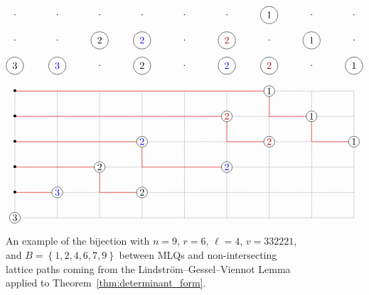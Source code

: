 \documentclass[submission]{FPSAC2018}
\newcommand{\set}[1]{\left\{ #1 \right\}}
\theoremstyle{plain}
\theoremstyle{definition}
\numberwithin{equation}{section}
\begin{document}
\begin{figure}[t]
\[
\begin{tikzpicture}[xscale=1.5,yscale=0.9]
  \begin{scope}[yshift=7cm]
    \foreach \i in {1,...,9}{
      \foreach \j in {0,1,2}{
        \node at (\i,\j){$\cdot$};
      }
    }
    \node[circle,fill=white,draw=black] at  (1, 0){$3$};
    \node[circle,fill=white,draw=black,text=blue] at  (2, 0){$3$};
    \node[circle,fill=white,draw=black] at  (4, 0){$2$};
    \node[circle,fill=white,draw=black,text=blue] at  (6, 0){$2$};
    \node[circle,fill=white,draw=black,text=darkred] at  (7, 0){$2$};
    \node[circle,fill=white,draw=black] at  (9, 0){$1$};
    \node[circle,fill=white,draw=black] at  (3, 1){$2$};
    \node[circle,fill=white,draw=black,text=blue] at  (4, 1){$2$};
    \node[circle,fill=white,draw=black,text=darkred] at  (6, 1){$2$};
    \node[circle,fill=white,draw=black] at  (8, 1){$1$};
    \node[circle,fill=white,draw=black] at  (7, 2){$1$};
  \end{scope}

  \draw[densely dotted] (1,1) grid (9,6);

  \draw[draw=red] (1,2)--(2,2);
  \draw[draw=red] (1,3)--(3,3)--(3,2)--(4,2);
  \draw[draw=red] (1,4)--(4,4)--(4,3)--(6,3);
  \draw[draw=red] (1,5)--(6,5)--(6,4)--(7,4);
  \draw[draw=red] (1,6)--(7,6)--(7,5)--(8,5)--(8,4)--(9,4);
  
  \node[circle,fill=white,draw=black,inner sep=1pt] at (1,1) {$3$};
  \node[circle,fill=white,draw=black,text=blue,inner sep=1pt] at (2,2) {$3$};
  \node[circle,fill=white,draw=black,inner sep=1pt] at (4,2) {$2$};
  \node[circle,fill=white,draw=black,inner sep=1pt] at (3,3) {$2$};
  \node[circle,fill=white,draw=black,text=blue,inner sep=1pt] at (4,4) {$2$};
  \node[circle,fill=white,draw=black,text=blue,inner sep=1pt] at (6,3) {$2$};
  \node[circle,fill=white,draw=black,text=darkred,inner sep=1pt] at (6,5) {$2$};
  \node[circle,fill=white,draw=black,text=darkred,inner sep=1pt] at (7,4) {$2$};
  \node[circle,fill=white,draw=black,inner sep=1pt] at (7,6) {$1$};
  \node[circle,fill=white,draw=black,inner sep=1pt] at (8,5) {$1$};
  \node[circle,fill=white,draw=black,inner sep=1pt] at (9,4) {$1$};

  \foreach \i in {2,...,6} {
    \node at (1,\i){\textbullet};
  }
\end{tikzpicture}
\]
\caption{An example of the bijection with $n = 9$, $r = 6$, $\ell = 4$, $v = 332221$, and $B = \set{1,2,4,6,7,9}$ between MLQs and non-intersecting lattice paths coming from the Lindstr\"om--Gessel--Viennot Lemma~\cite{GV85,Lindstrom73} applied to Theorem~\ref{thm:determinant_form}.}
\label{fig:lattice_path_bijection}
\end{figure}
\end{document}
